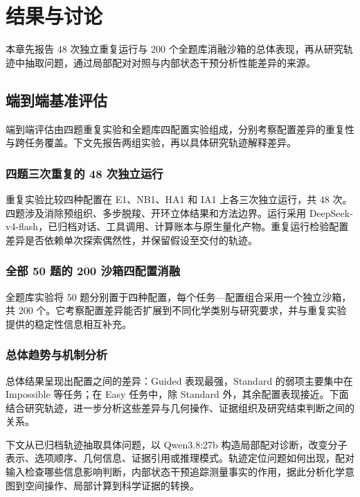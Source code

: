\section{结果与讨论}

本章先报告 48 次独立重复运行与 200 个全题库消融沙箱的总体表现，再从研究轨迹中抽取问题，通过局部配对对照与内部状态干预分析性能差异的来源。

\subsection{端到端基准评估}

端到端评估由四题重复实验和全题库四配置实验组成，分别考察配置差异的重复性与跨任务覆盖。下文先报告两组实验，再以具体研究轨迹解释差异。

\subsubsection{四题三次重复的 48 次独立运行}

重复实验比较四种配置在 E1、NB1、HA1 和 IA1 上各三次独立运行，共 48 次。四题涉及消除预组织、多步脱羧、开环立体结果和方法边界。运行采用 DeepSeek-v4-flash，已归档对话、工具调用、计算账本与原生量化产物。重复运行检验配置差异是否依赖单次探索偶然性，并保留假设至交付的轨迹。

\discussionSpace

\subsubsection{全部 50 题的 200 沙箱四配置消融}

全题库实验将 50 题分别置于四种配置，每个任务—配置组合采用一个独立沙箱，共 200 个。它考察配置差异能否扩展到不同化学类别与研究要求，并与重复实验提供的稳定性信息相互补充。

\discussionSpace

\subsubsection{总体趋势与机制分析}

总体结果呈现出配置之间的差异：Guided 表现最强，Standard 的弱项主要集中在 Impossible 等任务；在 Easy 任务中，除 Standard 外，其余配置表现接近。下面结合研究轨迹，进一步分析这些差异与几何操作、证据组织及研究结束判断之间的关系。

\discussionSpace

下文从已归档轨迹抽取具体问题，以 Qwen3.8:27b 构造局部配对诊断，改变分子表示、选项顺序、几何信息、证据引用或推理模式。轨迹定位问题如何出现，配对输入检查哪些信息影响判断，内部状态干预追踪测量事实的作用，据此分析化学意图到空间操作、局部计算到科学证据的转换。

